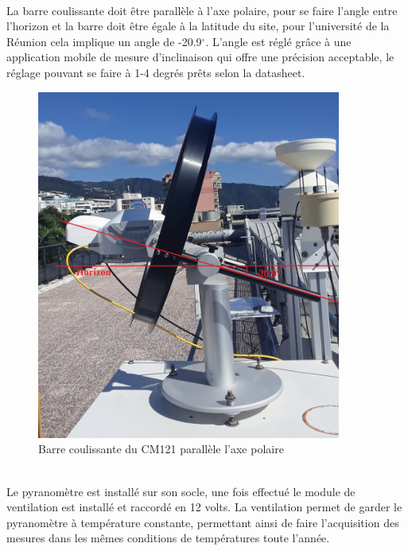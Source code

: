 \documentclass[12pt,a4paper]{article}
\begin{document}
\begin{flushleft}
~\\
La barre coulissante doit être parallèle à l'axe polaire, pour se faire l'angle entre l'horizon et la barre doit être égale à la latitude du site, pour l'université de la Réunion cela implique un angle de -20.9$^\circ$. L'angle est réglé grâce à une application mobile de mesure d'inclinaison qui offre une précision acceptable, le réglage pouvant se faire à 1-4 degrés prêts selon la datasheet.

\begin{figure}[H]
\centering
\includegraphics[width=10cm]{image/montage/3.jpg} 
\caption{Barre coulissante du CM121 parallèle l'axe polaire}
\end{figure}

~\\
Le pyranomètre est installé sur son socle, une fois effectué le module de ventilation est installé et raccordé en 12 volts. La ventilation permet de garder le pyranomètre à température constante, permettant ainsi de faire l'acquisition des mesures dans les mêmes conditions de températures toute l'année.


\end{flushleft}
\end{document}
